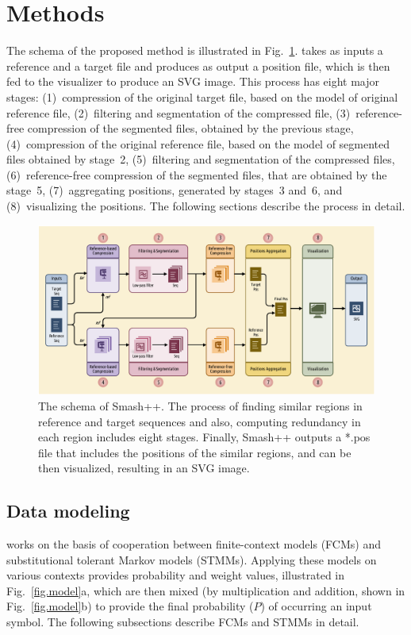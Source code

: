 \clearpage
\section{Methods} \label{sec.methods}
The schema of the proposed method is illustrated in Fig.~\ref{fig.schema}. \smashpp takes as inputs a reference and a target file and produces as output a position file, which is then fed to the \smashpp visualizer to produce an SVG image. This process has eight major stages: (1)~compression of the original target file, based on the model of original reference file, (2)~filtering and segmentation of the compressed file, (3)~reference-free compression of the segmented files, obtained by the previous stage, (4)~compression of the original reference file, based on the model of segmented files obtained by stage~2, (5)~filtering and segmentation of the compressed files, (6)~reference-free compression of the segmented files, that are obtained by the stage~5, (7)~aggregating positions, generated by stages~3 and~6, and (8)~visualizing the positions. The following sections describe the process in detail.

\begin{figure}[!h]
  \includegraphics[width=\linewidth]{schema.pdf}
  \caption{The schema of Smash++. The process of finding similar regions in reference and target sequences and also, computing redundancy in each region includes eight stages. Finally, Smash++ outputs a *.pos file that includes the positions of the similar regions, and can be then visualized, resulting in an SVG image.}
  \label{fig.schema}
\end{figure}

\subsection{Data modeling}
\smashpp works on the basis of cooperation between finite-context models (FCMs) and substitutional tolerant Markov models (STMMs). Applying these models on various contexts provides probability and weight values, illustrated in Fig.~\ref{fig.model}a, which are then mixed (by multiplication and addition, shown in Fig.~\ref{fig.model}b) to provide the final probability ($P$) of occurring an input symbol. The following subsections describe FCMs and STMMs in detail.

